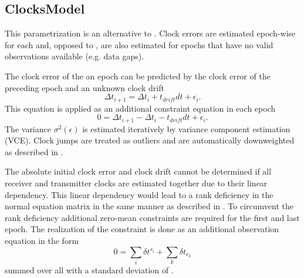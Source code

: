 \subsection{ClocksModel}\label{gnssParametrizationType:clocksModel}
This parametrization is an alternative to .
Clock errors are estimated epoch-wise for each 
and, opposed to , are also estimated for epochs
that have no valid observations available (e.g. data gaps).

The clock error of the an epoch can be predicted by the clock error
of the preceding epoch and an unknown clock drift
\begin{equation}
  \Delta t_{i+1} = \Delta t_{i} + t_{drift} dt + \epsilon_i.
\end{equation}
This equation is applied as an additional constraint equation in each epoch
\begin{equation}
   0 = \Delta t_{i+1} - \Delta t_{i} - t_{drift} dt + \epsilon_i.
\end{equation}
The variance $\sigma^2(\epsilon)$ is estimated iteratively by variance component estimation (VCE).
Clock jumps are treated as outliers and are automatically downweighted as described in
.

The absolute initial clock error and clock drift cannot be determined if all receiver
and transmitter clocks are estimated together due to their linear dependency.
This linear dependency would lead to a rank deficiency in the normal equation matrix in the same
manner as described in .
To circumvent the rank deficiency additional zero-mean constraints are required for the first and last epoch.
The realization of the constraint is done as an additional observation equation in the form
\begin{equation}
 0 = \sum_i \delta t^{s_i} + \sum_k \delta t_{r_k}
\end{equation}
summed over all 
with a standard deviation of .


